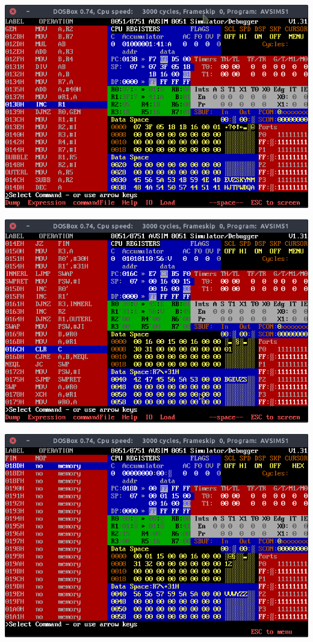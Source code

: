 \documentclass[doc, donotrepeattitle, biblatex, apacite]{apa6}
\begin{document}
\begin{center}
\includegraphics[scale=0.5]{icler8}

\includegraphics[scale=0.5]{icler9}

\includegraphics[scale=0.5]{icler10}


\end{center}
\end{document}
